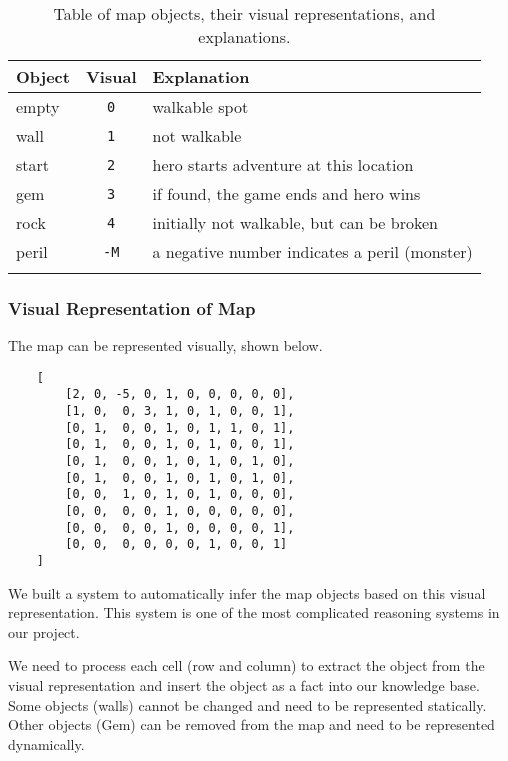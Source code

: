 \documentclass[10pt]{article}
\begin{document}
\begin{table}[h!]
\renewcommand{\arraystretch}{1.1}
\centering
\begin{tabular}{l c l}
\Xhline{1.5pt}
\textbf{Object} & \textbf{Visual} & \textbf{Explanation} \\
\hline
empty  & \texttt{0}     & walkable spot                                 \\
wall   & \texttt{1}     & not walkable                                  \\
start  & \texttt{2}     & hero starts adventure at this location        \\
gem    & \texttt{3}     & if found, the game ends and hero wins         \\
rock   & \texttt{4}     & initially not walkable, but can be broken     \\
peril  & \texttt{-M}    & a negative number indicates a peril (monster) \\
\Xhline{1.5pt}
\end{tabular}
\caption{Table of map objects, their visual representations, and explanations.}
\label{objects}
\end{table}


\subsubsection*{Visual Representation of Map}

The map can be represented visually, shown below.

\begin{verbatim}
    [
        [2, 0, -5, 0, 1, 0, 0, 0, 0, 0],
        [1, 0,  0, 3, 1, 0, 1, 0, 0, 1],
        [0, 1,  0, 0, 1, 0, 1, 1, 0, 1],
        [0, 1,  0, 0, 1, 0, 1, 0, 0, 1],
        [0, 1,  0, 0, 1, 0, 1, 0, 1, 0],
        [0, 1,  0, 0, 1, 0, 1, 0, 1, 0],
        [0, 0,  1, 0, 1, 0, 1, 0, 0, 0],
        [0, 0,  0, 0, 1, 0, 0, 0, 0, 0],
        [0, 0,  0, 0, 1, 0, 0, 0, 0, 1],
        [0, 0,  0, 0, 0, 0, 1, 0, 0, 1]
    ]
\end{verbatim}

We built a system to automatically infer the map objects based on this visual representation. This system is one of the most complicated reasoning systems in our project.

We need to process each cell (row and column) to extract the object from the visual representation and insert the object as a fact into our knowledge base. Some objects (walls) cannot be changed and need to be represented statically. Other objects (Gem) can be removed from the map and need to be represented dynamically.
\end{document}
